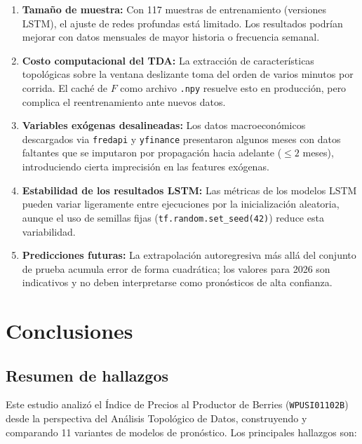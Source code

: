 \documentclass[12pt, a4paper]{article}
\begin{document}
\begin{enumerate}[leftmargin=1.5em]
  \item \textbf{Tamaño de muestra:} Con 117 muestras de entrenamiento (versiones LSTM), el
        ajuste de redes profundas está limitado. Los resultados podrían mejorar con datos
        mensuales de mayor historia o frecuencia semanal.
  \item \textbf{Costo computacional del TDA:} La extracción de características topológicas
        sobre la ventana deslizante toma del orden de varios minutos por corrida. El caché
        de $F$ como archivo \texttt{.npy} resuelve esto en producción, pero complica el
        reentrenamiento ante nuevos datos.
  \item \textbf{Variables exógenas desalineadas:} Los datos macroeconómicos descargados via
        \texttt{fredapi} y \texttt{yfinance} presentaron algunos meses con datos faltantes que
        se imputaron por propagación hacia adelante ($\leq 2$ meses), introduciendo cierta
        imprecisión en las features exógenas.
  \item \textbf{Estabilidad de los resultados LSTM:} Las métricas de los modelos LSTM pueden
        variar ligeramente entre ejecuciones por la inicialización aleatoria, aunque el uso de
        semillas fijas (\texttt{tf.random.set\_seed(42)}) reduce esta variabilidad.
  \item \textbf{Predicciones futuras:} La extrapolación autoregresiva más allá del conjunto de
        prueba acumula error de forma cuadrática; los valores para 2026 son indicativos y no
        deben interpretarse como pronósticos de alta confianza.
\end{enumerate}

\section{Conclusiones}

\subsection{Resumen de hallazgos}

Este estudio analizó el Índice de Precios al Productor de Berries (\texttt{WPUSI01102B}) desde
la perspectiva del Análisis Topológico de Datos, construyendo y comparando 11 variantes de
modelos de pronóstico. Los principales hallazgos son:
\end{document}

